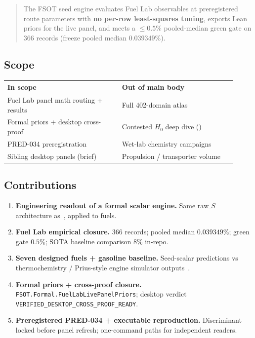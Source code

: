 \documentclass[11pt,a4paper]{article}
\begin{document}
\begin{quote}
The FSOT seed engine evaluates Fuel Lab observables at preregistered route
parameters with \textbf{no per-row least-squares tuning}, exports Lean priors
for the live panel, and meets a $\le 0.5\%$ pooled-median green gate on
366 records (freeze pooled median $0.039349\%$).
\end{quote}

\subsection{Scope}

\begin{center}
\begin{tabular}{@{}p{0.46\linewidth}p{0.46\linewidth}@{}}
\toprule
\textbf{In scope} & \textbf{Out of main body} \\
\midrule
Fuel Lab panel math routing + results & Full 402-domain atlas \\
Formal priors + desktop cross-proof & Contested $H_0$ deep dive (\cite{FSOTPaper01}) \\
PRED-034 preregistration & Wet-lab chemistry campaigns \\
Sibling desktop panels (brief) & Propulsion / transporter volume \\
\bottomrule
\end{tabular}
\end{center}

\subsection{Contributions}

\begin{enumerate}[leftmargin=*]
\item \textbf{Engineering readout of a formal scalar engine.}
  Same $\mathrm{raw}\_S$ architecture as~\cite{FSOTPaper01}, applied to fuels.
\item \textbf{Fuel Lab empirical closure.}
  366 records; pooled median $0.039349\%$; green gate $0.5\%$; SOTA baseline
  comparison $8\%$ in-repo.
\item \textbf{Seven designed fuels + gasoline baseline.}
  Seed-scalar predictions vs thermochemistry / Prius-style engine simulator
  outputs~\cite{FSOT21Lean}.
\item \textbf{Formal priors + cross-proof closure.}
  \texttt{FSOT.Formal.FuelLabLivePanelPriors}; desktop verdict
  \texttt{VERIFIED\_DESKTOP\_CROSS\_PROOF\_READY}.
\item \textbf{Preregistered PRED-034 + executable reproduction.}
  Discriminant locked before panel refresh; one-command paths for independent
  readers.
\end{enumerate}
\end{document}
